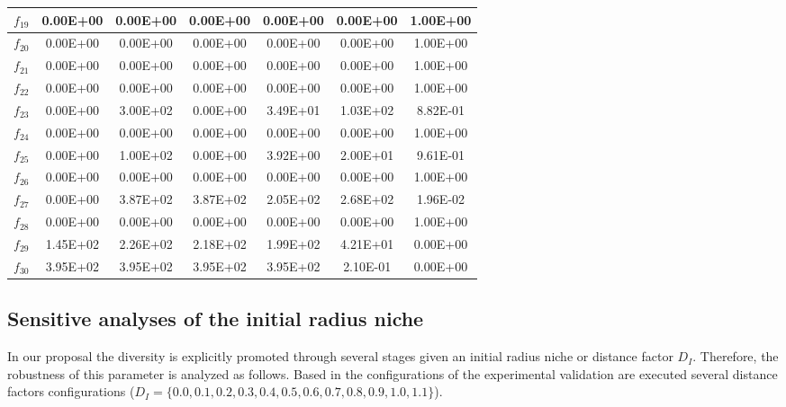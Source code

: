 \begin{table}[t]
\begin{scriptsize}
\begin{tabular}{|c|c|c|c|c|c|c|}
$f_{19}$ & 0.00E+00 & 0.00E+00 & 0.00E+00 & 0.00E+00 & 0.00E+00 & 1.00E+00 \\ \hline
$f_{20}$ & 0.00E+00 & 0.00E+00 & 0.00E+00 & 0.00E+00 & 0.00E+00 & 1.00E+00 \\ \hline
$f_{21}$ & 0.00E+00 & 0.00E+00 & 0.00E+00 & 0.00E+00 & 0.00E+00 & 1.00E+00 \\ \hline
$f_{22}$ & 0.00E+00 & 0.00E+00 & 0.00E+00 & 0.00E+00 & 0.00E+00 & 1.00E+00 \\ \hline
$f_{23}$ & 0.00E+00 & 3.00E+02 & 0.00E+00 & 3.49E+01 & 1.03E+02 & 8.82E-01 \\ \hline
$f_{24}$ & 0.00E+00 & 0.00E+00 & 0.00E+00 & 0.00E+00 & 0.00E+00 & 1.00E+00 \\ \hline
$f_{25}$ & 0.00E+00 & 1.00E+02 & 0.00E+00 & 3.92E+00 & 2.00E+01 & 9.61E-01 \\ \hline
$f_{26}$ & 0.00E+00 & 0.00E+00 & 0.00E+00 & 0.00E+00 & 0.00E+00 & 1.00E+00 \\ \hline
$f_{27}$ & 0.00E+00 & 3.87E+02 & 3.87E+02 & 2.05E+02 & 2.68E+02 & 1.96E-02 \\ \hline
$f_{28}$ & 0.00E+00 & 0.00E+00 & 0.00E+00 & 0.00E+00 & 0.00E+00 & 1.00E+00 \\ \hline
$f_{29}$ & 1.45E+02 & 2.26E+02 & 2.18E+02 & 1.99E+02 & 4.21E+01 & 0.00E+00 \\ \hline
$f_{30}$ & 3.95E+02 & 3.95E+02 & 3.95E+02 & 3.95E+02 & 2.10E-01 & 0.00E+00 \\ \hline
\end{tabular}%
\end{scriptsize}
\end{table}

\subsection{Sensitive analyses of the initial radius niche}

In our proposal the diversity is explicitly promoted through several stages given an initial radius niche or distance factor $D_I$.
%
Therefore, the robustness of this parameter is analyzed as follows.
%
Based in the configurations of the experimental validation are executed several distance factors configurations ($D_I = \{0.0, 0.1, 0.2, 0.3, 0.4, 0.5, 0.6, 0.7, 0.8, 0.9, 1.0, 1.1 \}$).
%


